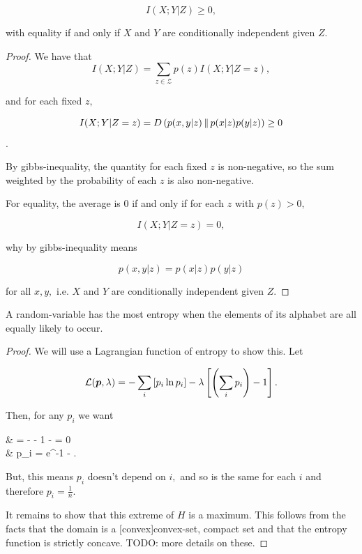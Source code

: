 \documentclass{article}
\begin{document}
\begin{corollary}
	\[ I(X; Y |Z) \geq 0, \]

	with equality if and only if $X$ and $Y$ are \@{conditionally independent} given $Z.$
	\begin{proof}
        We have that
	\[ I(X; Y | Z) = \sum_{z \in \mathcal{Z}} p(z) I(X; Y | Z = z), \]

	and for each fixed $z,$
	
	\[ I(X; Y | Z = z)  = D\left( p(x,y |z) \,\middle\|\, p(x |z)p(y |z) \right) \geq 0 \].
	
	By \@{gibbs-inequality}, the quantity for each fixed $z$ is non-negative, so the sum weighted by the probability of each $z$ is also non-negative.

	For equality, the average is $0$ if and only if for each $z$ with $p(z) > 0,$

	\[ I(X; Y | Z = z) = 0, \]

	why by \@{gibbs-inequality} means
	
	\[ p(x, y|z) = p(x|z) p(y|z) \]
	
		for all $x, y,$ i.e. $X$ and $Y$ are \@{conditionally independent} given $Z.$
	\end{proof}
\end{corollary}


\begin{theorem}
A \@{random-variable} has the most \@{entropy} when the \@{elements} of its alphabet are all equally likely to occur.
\end{theorem}

\begin{proof}
We will use a \@{Lagrangian} function of \@{entropy} to show this. Let

\[ \mathcal{L}(\boldsymbol{p}, \lambda) = - \sum_i \left[p_i \ln{p_i}\right] - \lambda \left[\left(\sum_i p_i\right) - 1\right]. \]

Then, for any $p_i$ we want

\bal 
{} & = - - 1 - \lambda = 0 \\
                                          & \implies p_i = e^{-1 - \lambda}.
\eal

But, this means $p_i$ doesn't depend on $i,$ and so is the same for each $i$ and therefore $p_i = \frac{1}{n}.$

It remains to show that this extreme of $H$ is a maximum. This follows from the facts that the domain is a \@[convex]{convex-set}, \@{compact} set and that the entropy function is strictly \@{concave}. TODO: more details on these.
\end{proof}
\end{document}
